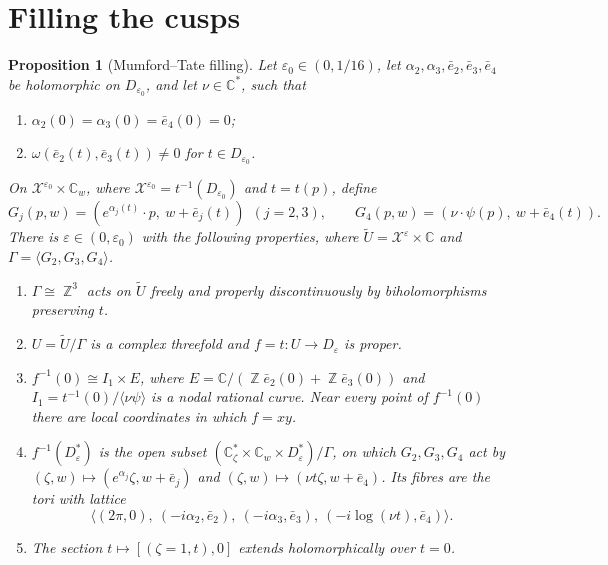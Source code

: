 \documentclass{article}
\DeclareMathOperator{\Z}{\mathbb{Z}}
\newtheorem{proposition}[theorem]{Proposition}
\theoremstyle{definition}
\theoremstyle{plain}
\newcommand{\C}{\mathbb{C}}
\newcommand{\cX}{\mathcal{X}}
\newcommand{\eb}{\bar e}
\newcommand{\Ut}{\widetilde{U}}
\begin{document}
\section{Filling the cusps}\label{sec:filling}

\begin{proposition}[Mumford--Tate filling]\label{prop:filling}
Let $\varepsilon_0\in(0,1/16)$, let $\alpha_2,\alpha_3,\eb_2,\eb_3,\eb_4$ be holomorphic on
$D_{\varepsilon_0}$, and let $\nu\in\C^*$, such that
\begin{enumerate}
\item[(H1)] $\alpha_2(0)=\alpha_3(0)=\eb_4(0)=0$;
\item[(H2)] $\omega(\eb_2(t),\eb_3(t))\neq0$ for $t\in D_{\varepsilon_0}$.
\end{enumerate}
On $\cX^{\varepsilon_0}\times\C_w$, where $\cX^{\varepsilon_0}=t^{-1}(D_{\varepsilon_0})$
and $t=t(p)$, define
\[
G_j(p,w)=(e^{\alpha_j(t)}\cdot p,\ w+\eb_j(t))\ \ (j=2,3),\qquad
G_4(p,w)=(\nu\cdot\psi(p),\ w+\eb_4(t)).
\]
There is $\varepsilon\in(0,\varepsilon_0)$ with the following properties, where
$\Ut=\cX^\varepsilon\times\C$ and $\Gamma=\langle G_2,G_3,G_4\rangle$.
\begin{enumerate}
\item[(a)] $\Gamma\cong\Z^3$ acts on $\Ut$ freely and properly discontinuously by
  biholomorphisms preserving $t$.
\item[(b)] $U=\Ut/\Gamma$ is a complex threefold and $f=t\colon U\to D_\varepsilon$ is
  proper.
\item[(c)] $f^{-1}(0)\cong I_1\times E$, where $E=\C/(\Z\eb_2(0)+\Z\eb_3(0))$ and
  $I_1=t^{-1}(0)/\langle \nu\psi\rangle$ is a nodal rational curve. Near every point of
  $f^{-1}(0)$ there are local coordinates in which $f=xy$.
\item[(d)] $f^{-1}(D^*_\varepsilon)$ is the open subset
  $(\C^*_\zeta\times\C_w\times D^*_\varepsilon)/\Gamma$,
  on which $G_2,G_3,G_4$ act by
  $(\zeta,w)\mapsto(e^{\alpha_j}\zeta,w+\eb_j)$ and $(\zeta,w)\mapsto(\nu t\zeta,w+\eb_4)$.
  Its fibres are the tori with lattice
  \[\big\langle(2\pi,0),\ (-i\alpha_2,\eb_2),\ (-i\alpha_3,\eb_3),\ (-i\log(\nu t),\eb_4)\big\rangle.\]
\item[(e)] The section $t\mapsto[(\zeta{=}1,t),0]$ extends holomorphically over $t=0$.
\end{enumerate}
\end{proposition}
\end{document}
